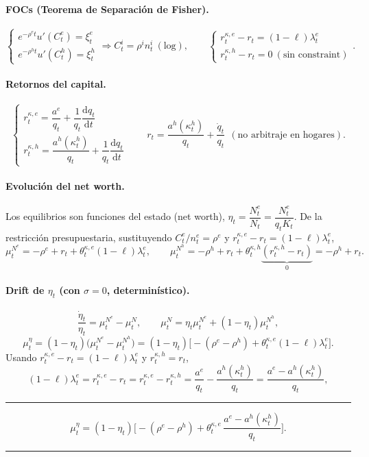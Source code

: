 \documentclass[11pt]{article}
\theoremstyle{definition}
\theoremstyle{remark}
\newenvironment{resultado}
  {\par\medskip\noindent\begin{minipage}{\linewidth}\rule{\linewidth}{0.4pt}\par\smallskip\noindent}
  {\par\smallskip\noindent\rule{\linewidth}{0.4pt}\end{minipage}\medskip\par}
\newcommand{\dd}{\mathrm{d}}
\newcommand{\aE}{a^{e}}
\newcommand{\aH}{a^{h}}
\newcommand{\re}{\rho^{e}}
\newcommand{\rh}{\rho^{h}}
\newcommand{\thke}{\theta_t^{\kappa,e}}
\newcommand{\thkh}{\theta_t^{\kappa,h}}
\begin{document}
\paragraph{FOCs (Teorema de Separación de Fisher).}
\[
\begin{cases}
e^{-\re t}u'(C_t^{e})=\xi_t^{e}\\
e^{-\rh t}u'(C_t^{h})=\xi_t^{h}
\end{cases}
\Rightarrow C_t^{i}=\rho^{i}n_t^{i}\ (\text{log}),
\qquad
\begin{cases}
r_t^{\kappa,e}-r_t=(1-\ell)\lambda_t^{e}\\
r_t^{\kappa,h}-r_t=0\ (\text{sin constraint})
\end{cases}.
\]

\paragraph{Retornos del capital.}
\[
\begin{cases}
r_t^{\kappa,e}=\dfrac{\aE}{q_t}+\dfrac{1}{q_t}\dfrac{\dd q_t}{\dd t}\\[6pt]
r_t^{\kappa,h}=\dfrac{\aH(\kappa_t^{h})}{q_t}+\dfrac{1}{q_t}\dfrac{\dd q_t}{\dd t}
\end{cases}
\qquad
r_t=\frac{\aH(\kappa_t^{h})}{q_t}+\frac{\dot q_t}{q_t}\ \ (\text{no arbitraje en hogares}).
\]

\paragraph{Evolución del net worth.} Los equilibrios son funciones del estado (net worth), $\eta_t=\dfrac{N_t^{e}}{N_t}=\dfrac{N_t^{e}}{q_tK_t}$. De la restricción presupuestaria, sustituyendo $C_t^{e}/n_t^{e}=\re$ y $r_t^{\kappa,e}-r_t=(1-\ell)\lambda_t^{e}$,
\[
\mu_t^{N^{e}}=-\re+r_t+\thke(1-\ell)\lambda_t^{e},
\qquad
\mu_t^{N^{h}}=-\rh+r_t+\thkh\underbrace{(r_t^{\kappa,h}-r_t)}_{0}=-\rh+r_t.
\]

\paragraph{Drift de $\eta_t$ (con $\sigma=0$, determinístico).}
\[
\frac{\dot\eta_t}{\eta_t}=\mu_t^{N^{e}}-\mu_t^{N},
\qquad
\mu_t^{N}=\eta_t\mu_t^{N^{e}}+(1-\eta_t)\mu_t^{N^{h}},
\]
\[
\mu_t^{\eta}=(1-\eta_t)\big(\mu_t^{N^{e}}-\mu_t^{N^{h}}\big)
=(1-\eta_t)\big[-(\re-\rh)+\thke(1-\ell)\lambda_t^{e}\big].
\]
Usando $r_t^{\kappa,e}-r_t=(1-\ell)\lambda_t^{e}$ y $r_t^{\kappa,h}=r_t$,
\[
(1-\ell)\lambda_t^{e}=r_t^{\kappa,e}-r_t=r_t^{\kappa,e}-r_t^{\kappa,h}=\frac{\aE}{q_t}-\frac{\aH(\kappa_t^{h})}{q_t}=\frac{\aE-\aH(\kappa_t^{h})}{q_t},
\]
\begin{resultado}
\begin{equation}\label{eq:km-eta}
\mu_t^{\eta}=(1-\eta_t)\Big[-(\re-\rh)+\thke\,\frac{\aE-\aH(\kappa_t^{h})}{q_t}\Big].
\end{equation}
\end{resultado}
\end{document}
